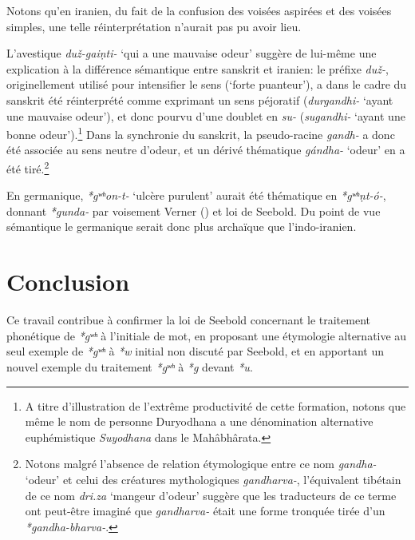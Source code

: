 \documentclass[11pt]{article}
\newcommand{\ipa}[1]{{\phon\textit{#1}}}
\begin{document}
Notons qu'en iranien, du fait de la confusion des voisées aspirées et des voisées simples, une telle réinterprétation n'aurait pas pu avoir lieu.

L'avestique \ipa{duž-gaiṇti-} `qui a une mauvaise odeur' suggère de lui-même une explication à la différence sémantique entre sanskrit et iranien: le préfixe \ipa{duž-}, originellement utilisé pour intensifier le sens (`forte puanteur'), a dans le cadre du sanskrit été réinterprété comme exprimant un sens péjoratif (\ipa{durgandhi-} `ayant une mauvaise odeur'), et donc pourvu d'une doublet en \ipa{su-} (\ipa{sugandhi-} `ayant une bonne odeur').\footnote{A titre d'illustration de l'extrême productivité de cette formation, notons que même le nom de personne Duryodhana a  une dénomination alternative euphémistique \textit{Suyodhana} dans le Mahâbhârata.} Dans la synchronie du sanskrit, la pseudo-racine \ipa{gandh-} a donc été associée au sens neutre d'odeur, et un dérivé thématique \ipa{gándha-} `odeur' en a été tiré.\footnote{Notons malgré l'absence de relation étymologique entre ce nom \ipa{gandha-} `odeur' et celui des créatures mythologiques \ipa{gandharva-}, l'équivalent tibétain de ce nom \ipa{dri.za} `mangeur d'odeur' suggère que les traducteurs de ce terme ont peut-être imaginé que \ipa{gandharva-} était une forme tronquée tirée d'un \ipa{*gandha-bharva-}.}


En germanique, \ipa{*gʷʰon-t-} `ulcère purulent' aurait été thématique en \ipa{*gʷʰṇt-ó-}, donnant \ipa{*gunda-} par voisement Verner (\citealt[128]{schaffner01vernersche}) et loi de Seebold. Du point de vue sémantique le germanique serait donc plus archaïque que l'indo-iranien.


\section{Conclusion}
Ce travail contribue à confirmer la loi de Seebold concernant le traitement phonétique de \ipa{*gʷʰ} à l'initiale de mot, en proposant une étymologie alternative au seul exemple de \ipa{*gʷʰ} à \ipa{*w} initial non discuté par Seebold, et en apportant un nouvel exemple du traitement \ipa{*gʷʰ} à \ipa{*g} devant \ipa{*u}.





 
\end{document}
